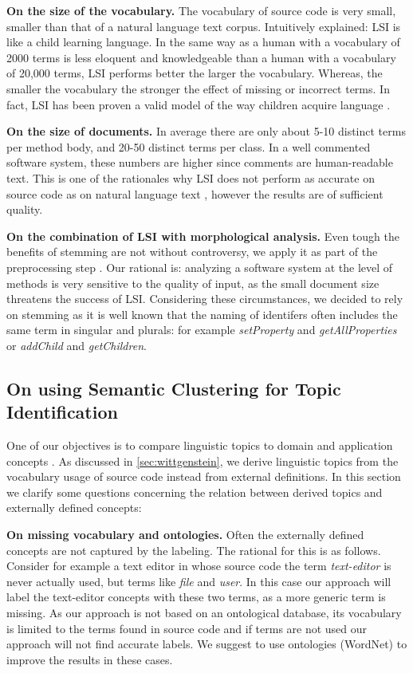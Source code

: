 \documentclass[10pt]{book}
\begin{document}
\textbf{On the size of the vocabulary.}  The vocabulary of source code is very small, smaller than that of a natural language text corpus. Intuitively explained: LSI is like a child learning language. In the same way as a human with a vocabulary of 2000 terms is less eloquent and knowledgeable than a human with a vocabulary of 20,000 terms, LSI performs better the larger the vocabulary. Whereas, the smaller the vocabulary the stronger the effect of missing or incorrect terms. In fact, LSI has been proven a valid model of the way children acquire language \cite{Land97a}.

\textbf{On the size of documents.} In average there are only about 5-10 distinct terms per method body, and 20-50 distinct terms per class. In a well commented software system, these numbers are higher since comments are human-readable text. This is one of the rationales why LSI does not perform as accurate on source code as on natural language text \cite{Luci04a}, however the results are of sufficient quality.

\textbf{On the combination of LSI with morphological analysis.} Even tough the benefits of stemming are not without controversy, we apply it as part of the preprocessing step \cite{Baez99b}. Our rational is: analyzing a software system at the level of methods is very sensitive to the quality of input, as the small document size threatens the success of LSI. Considering these circumstances, we  decided to rely on stemming as it is well known that the naming of identifers often includes the same term in singular and plurals: for example \emph{setProperty} and \emph{getAllProperties} or \emph{addChild} and \emph{getChildren}.

\subsection{On using Semantic Clustering for Topic Identification}

One of our objectives is to compare linguistic topics to domain and application concepts \cite{Bigg93a}. As discussed in \autoref{sec:wittgenstein}, we derive linguistic topics from the vocabulary usage of source code instead from external definitions. In this section we clarify some questions concerning the relation between derived topics and externally defined concepts:

\textbf{On missing vocabulary and ontologies.} Often the externally defined concepts are not captured by the labeling. The rational for this is as follows. Consider for example a text editor in whose source code the term \emph{text-editor} is never actually used, but terms like \emph{file} and \emph{user}. In this case our approach will label the text-editor concepts with these two terms, as a more generic term is missing. As our approach is not based on an ontological database, its vocabulary is limited to the terms found in source code and if terms are not used our approach will not find accurate labels. We suggest to use ontologies (\ie WordNet) to improve the results in these cases.
\end{document}
